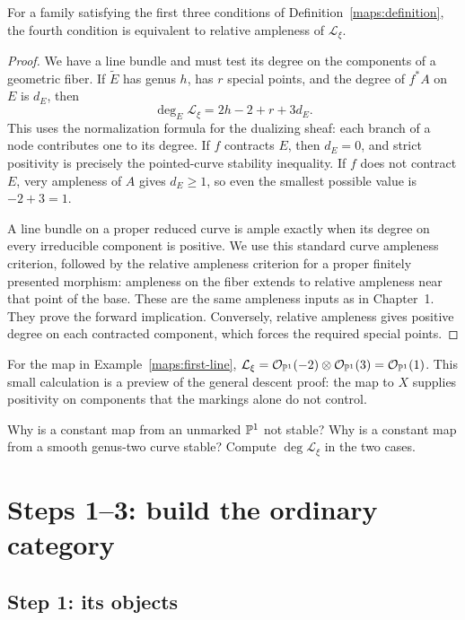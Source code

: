 \begin{Lem}\label{maps:ample}
For a family satisfying the first three conditions of Definition~\ref{maps:definition}, the fourth condition is equivalent to relative ampleness of $\mathcal L_\xi$.
\end{Lem}
\begin{proof}
We have a line bundle and must test its degree on the components of a geometric fiber. If $\widetilde E$ has genus $h$, has $r$ special points, and the degree of $f^*A$ on $E$ is $d_E$, then
\[
 \deg_E\mathcal L_\xi=2h-2+r+3d_E.
\]
This uses the normalization formula for the dualizing sheaf: each branch of a node contributes one to its degree. If $f$ contracts $E$, then $d_E=0$, and strict positivity is precisely the pointed-curve stability inequality. If $f$ does not contract $E$, very ampleness of $A$ gives $d_E\geq1$, so even the smallest possible value is $-2+3=1$.

A line bundle on a proper reduced curve is ample exactly when its degree on every irreducible component is positive. We use this standard curve ampleness criterion, followed by the relative ampleness criterion for a proper finitely presented morphism: ampleness on the fiber extends to relative ampleness near that point of the base. These are the same ampleness inputs as in Chapter~1. They prove the forward implication. Conversely, relative ampleness gives positive degree on each contracted component, which forces the required special points.
\end{proof}

For the map in Example~\ref{maps:first-line}, $\mathcal L_\xi=\mathcal O_{\mathbb P^1}(-2)\otimes\mathcal O_{\mathbb P^1}(3)=\mathcal O_{\mathbb P^1}(1)$. This small calculation is a preview of the general descent proof: the map to $X$ supplies positivity on components that the markings alone do not control.

\begin{Ej}\label{maps:ex-stability}
Why is a constant map from an unmarked $\mathbb P^1$ not stable? Why is a constant map from a smooth genus-two curve stable? Compute $\deg\mathcal L_\xi$ in the two cases.
\end{Ej}

\section{Steps 1--3: build the ordinary category}

\subsection{Step 1: its objects}

